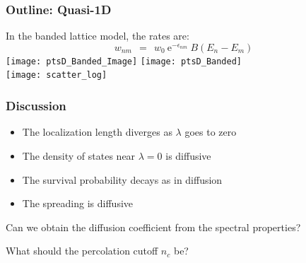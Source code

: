\documentclass{beamer}
\newcommand{\eexp}{\mbox{e}^}
\begin{document}
\begin{frame}
\frametitle{Outline: Quasi-1D}
In the banded lattice model, the rates are:
\[  w_{nm} \ \ = \ \ w_0 \ \eexp{-\epsilon_{nm}} \ B\left(E_n-E_m\right)\]
\texttt{[image: ptsD\_Banded\_Image]}
\texttt{[image: ptsD\_Banded]}\\
\texttt{[image: scatter\_log]}
\end{frame}

\begin{frame}
\frametitle{Discussion}
\begin{itemize}
  \item The localization length diverges as $\lambda$ goes to zero
  \item The density of states near $\lambda=0$ is diffusive
  \item The survival probability decays as in diffusion
  \item The spreading is diffusive
\end{itemize}
\vspace{20pt}
Can we obtain the diffusion coefficient from the spectral properties?

\vspace{20pt}
What should the percolation cutoff $n_c$ be?
\end{frame}
\end{document}
